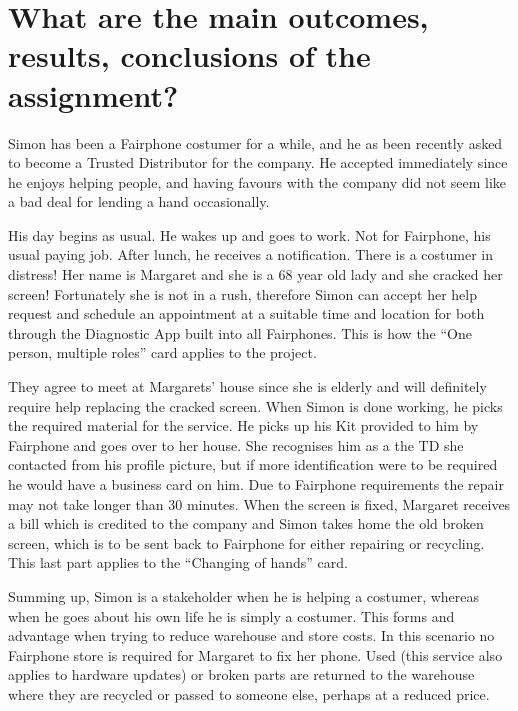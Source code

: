 \section{What are the main outcomes, results, conclusions of the assignment?}

Simon has been a Fairphone costumer for a while, and he as been recently asked to become a Trusted Distributor for the company. He accepted immediately since he enjoys helping people, and having favours with the company did not seem like a bad deal for lending a hand occasionally. 

His day begins as usual. He wakes up and goes to work. Not for Fairphone, his usual paying job. After lunch, he receives a notification. There is a costumer in distress! Her name is Margaret and she is a 68 year old lady and she cracked her screen! Fortunately she is not in a rush, therefore Simon can accept her help request and schedule an appointment at a suitable time and location for both through the Diagnostic App built into all Fairphones. This is how the ``One person, multiple roles'' card applies to the project.

They agree to meet at Margarets' house since she is elderly and will definitely require help replacing the cracked screen. When Simon is done working, he picks the required material for the service. He picks up his Kit provided to him by Fairphone and goes over to her house. She recognises him as a the TD she contacted from his profile picture, but if more identification were to be required he would have a business card on him. Due to Fairphone requirements the repair may not take longer than 30 minutes. When the screen is fixed, Margaret receives a bill which is credited to the company and Simon takes home the old broken screen, which is to be sent back to Fairphone for either repairing or recycling. This last part applies to the ``Changing of hands'' card.  

Summing up, Simon is a stakeholder when he is helping a costumer, whereas when he goes about his own life he is simply a costumer. This forms and advantage when trying to reduce warehouse and store costs. In this scenario no Fairphone store is required for Margaret to fix her phone. Used (this service also applies to hardware updates) or broken parts are returned to the warehouse where they are recycled or passed to someone else, perhaps at a reduced price.
